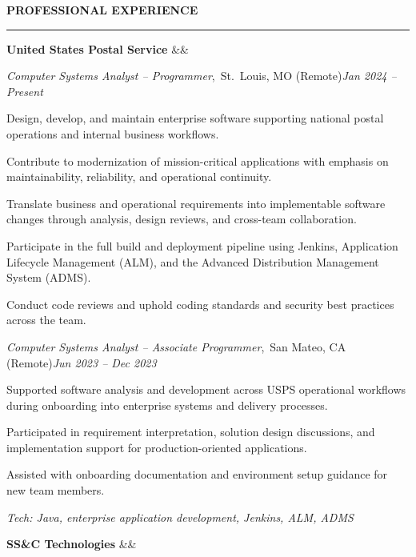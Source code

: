 \documentclass[letterpaper, 11pt]{article}
\newcommand{\rsection}[1]{%
  \vspace{8pt}%
  {\large\textbf{#1}}\\[-5pt]%
  \rule{\textwidth}{0.5pt}%
  \vspace{3pt}%
}
\newcommand{\employer}[3]{%
  \noindent\textbf{#1}\hfill\textit{#3}%
  \ifx&#2&\else\\\textit{#2}\fi%
}
\newcommand{\role}[3]{%
  \vspace{3pt}%
  \noindent\hspace*{1em}\textit{#1},\ #2\hfill\textit{#3}%
}
\begin{document}
\rsection{PROFESSIONAL EXPERIENCE}

\employer{United States Postal Service}{}{}

\role{Computer Systems Analyst -- Programmer}{St.\ Louis, MO (Remote)}{Jan 2024 -- Present}
\begin{compactitem}
  \item Design, develop, and maintain enterprise software supporting national postal operations
        and internal business workflows.
  \item Contribute to modernization of mission-critical applications with emphasis on
        maintainability, reliability, and operational continuity.
  \item Translate business and operational requirements into implementable software changes
        through analysis, design reviews, and cross-team collaboration.
  \item Participate in the full build and deployment pipeline using Jenkins,
        Application Lifecycle Management (ALM), and the Advanced Distribution Management
        System (ADMS).
  \item Conduct code reviews and uphold coding standards and security best practices across
        the team.
\end{compactitem}

\role{Computer Systems Analyst -- Associate Programmer}{San Mateo, CA (Remote)}{Jun 2023 -- Dec 2023}
\begin{compactitem}
  \item Supported software analysis and development across USPS operational workflows during
        onboarding into enterprise systems and delivery processes.
  \item Participated in requirement interpretation, solution design discussions, and
        implementation support for production-oriented applications.
  \item Assisted with onboarding documentation and environment setup guidance for new team members.
\end{compactitem}

\noindent\textit{Tech: Java, enterprise application development, Jenkins, ALM, ADMS}

\vspace{8pt}

\employer{SS\&C Technologies}{}{}
\end{document}
